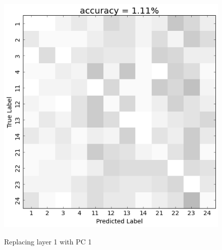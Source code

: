 \begin{figure}[h] 
  \begin{center}
    \includegraphics[scale=0.5]{Figures/PC1_confusion}
   \\\vspace{-0.8em}
    \caption{Replacing layer 1 with PC 1}
    \label{fig:PC1_confusion}
  \end{center}
  \vspace{-1em}
\end{figure}

